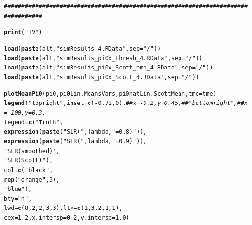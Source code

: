 \documentclass{article}\usepackage[]{graphicx}\usepackage[]{color}
\makeatletter
\newcommand{\hlnum}[1]{\textcolor[rgb]{0.686,0.059,0.569}{#1}}%
\newcommand{\hlstr}[1]{\textcolor[rgb]{0.192,0.494,0.8}{#1}}%
\newcommand{\hlcom}[1]{\textcolor[rgb]{0.678,0.584,0.686}{\textit{#1}}}%
\newcommand{\hlopt}[1]{\textcolor[rgb]{0,0,0}{#1}}%
\newcommand{\hlstd}[1]{\textcolor[rgb]{0.345,0.345,0.345}{#1}}%
\newcommand{\hlkwc}[1]{\textcolor[rgb]{0.333,0.667,0.333}{#1}}%
\newcommand{\hlkwd}[1]{\textcolor[rgb]{0.737,0.353,0.396}{\textbf{#1}}}%
\newenvironment{kframe}{%
 \def\at@end@of@kframe{}%
 \ifinner\ifhmode%
  \def\at@end@of@kframe{\end{minipage}}%
  \begin{minipage}{\columnwidth}%
 \fi\fi%
 \def\FrameCommand##1{\hskip\@totalleftmargin \hskip-\fboxsep
 \colorbox{shadecolor}{##1}\hskip-\fboxsep
     \hskip-\linewidth \hskip-\@totalleftmargin \hskip\columnwidth}%
 \MakeFramed {\advance\hsize-\width
   \@totalleftmargin\z@ \linewidth\hsize
   \@setminipage}}%
 {\par\unskip\endMakeFramed%
 \at@end@of@kframe}
\newenvironment{knitrout}{}{} %
\makeatother
\begin{document}
\begin{knitrout}
\begin{kframe}
\begin{alltt}
     \hlcom{#################################################################################}

    \hlkwd{print}\hlstd{(}\hlstr{"IV"}\hlstd{)}

  \hlkwd{load}\hlstd{(}\hlkwd{paste}\hlstd{(alt,}\hlstr{"simResults_4.RData"}\hlstd{,}\hlkwc{sep}\hlstd{=}\hlstr{"/"}\hlstd{))}
  \hlkwd{load}\hlstd{(}\hlkwd{paste}\hlstd{(alt,}\hlstr{"simResults_pi0x_thresh_4.RData"}\hlstd{,}\hlkwc{sep}\hlstd{=}\hlstr{"/"}\hlstd{))}
  \hlkwd{load}\hlstd{(}\hlkwd{paste}\hlstd{(alt,}\hlstr{"simResults_pi0x_Scott_emp_4.RData"}\hlstd{,}\hlkwc{sep}\hlstd{=}\hlstr{"/"}\hlstd{))}
  \hlkwd{load}\hlstd{(}\hlkwd{paste}\hlstd{(alt,}\hlstr{"simResults_pi0x_Scott_4.RData"}\hlstd{,}\hlkwc{sep}\hlstd{=}\hlstr{"/"}\hlstd{))}

  \hlkwd{plotMeanPi0}\hlstd{(pi0, pi0Lin.MeansVars, pi0hatLin.ScottMean,} \hlkwc{tme}\hlstd{=tme)}
  \hlkwd{legend}\hlstd{(}\hlstr{"topright"}\hlstd{,} \hlkwc{inset}\hlstd{=}\hlkwd{c}\hlstd{(}\hlopt{-}\hlnum{0.71}\hlstd{,}\hlnum{0}\hlstd{),}\hlcom{##x=-0.2, y=0.45,##"bottomright", ##x=-100, y=0.3, }
         \hlkwc{legend}\hlstd{=}\hlkwd{c}\hlstd{(}\hlstr{"Truth"}\hlstd{,}
                  \hlkwd{expression}\hlstd{(}\hlkwd{paste}\hlstd{(}\hlstr{"SLR ("}\hlstd{, lambda,} \hlstr{"=0.8)"}\hlstd{)),}
                  \hlkwd{expression}\hlstd{(}\hlkwd{paste}\hlstd{(}\hlstr{"SLR ("}\hlstd{, lambda,} \hlstr{"=0.9)"}\hlstd{)),}
                  \hlstr{"SLR (smoothed)"}\hlstd{,}
                  \hlstr{"SLR (Scott)"}\hlstd{),}
         \hlkwc{col}\hlstd{=}\hlkwd{c}\hlstd{(}\hlstr{"black"}\hlstd{,}
               \hlkwd{rep}\hlstd{(}\hlstr{"orange"}\hlstd{,}\hlnum{3}\hlstd{),}
               \hlstr{"blue"}\hlstd{),}
         \hlkwc{bty}\hlstd{=}\hlstr{"n"}\hlstd{,}
         \hlkwc{lwd}\hlstd{=}\hlkwd{c}\hlstd{(}\hlnum{8}\hlstd{,}\hlnum{2}\hlstd{,}\hlnum{2}\hlstd{,}\hlnum{3}\hlstd{,}\hlnum{3}\hlstd{),} \hlkwc{lty}\hlstd{=}\hlkwd{c}\hlstd{(}\hlnum{1}\hlstd{,}\hlnum{3}\hlstd{,}\hlnum{2}\hlstd{,}\hlnum{1}\hlstd{,}\hlnum{1}\hlstd{),}
         \hlkwc{cex}\hlstd{=}\hlnum{1.2}\hlstd{,} \hlkwc{x.intersp}\hlstd{=}\hlnum{0.2}\hlstd{,} \hlkwc{y.intersp}\hlstd{=}\hlnum{1.0}\hlstd{)}


\end{alltt}
\end{kframe}
\end{knitrout}
\end{document}
